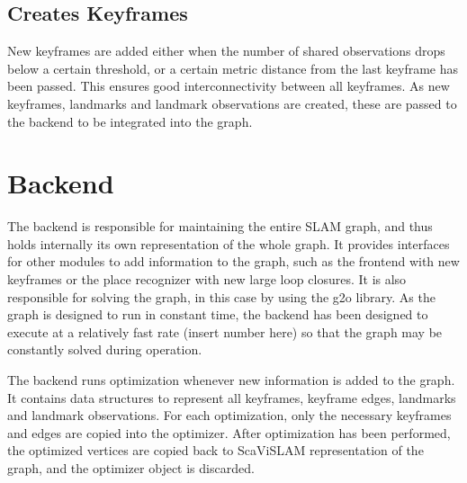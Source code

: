 \subsection{Creates Keyframes}

New keyframes are added either when the number of shared observations drops below a certain threshold, or a certain metric distance from the last keyframe has been passed.  This ensures good interconnectivity between all keyframes.  As new keyframes, landmarks and landmark observations are created, these are passed to the backend to be integrated into the graph.

\section{Backend}
\label{sec:scavislam_backend}

The backend is responsible for maintaining the entire SLAM graph, and thus holds internally its own representation of the whole graph.  It provides interfaces for other modules to add information to the graph, such as the frontend with new keyframes or the place recognizer with new large loop closures. It is also responsible for solving the graph, in this case by using the g2o library. As the graph is designed to run in constant time, the backend has been designed to execute at a relatively fast rate (insert number here) so that the graph may be constantly solved during operation.


The backend runs optimization whenever new information is added to the graph.  It contains data structures to represent all keyframes, keyframe edges, landmarks and landmark observations.  For each optimization, only the necessary keyframes and edges are copied into the optimizer.  After optimization has been performed, the optimized vertices are copied back to ScaViSLAM representation of the graph, and the optimizer object is discarded.

